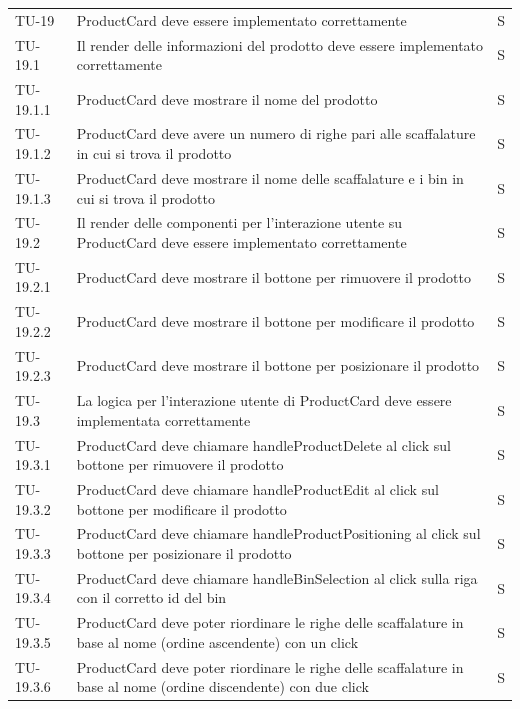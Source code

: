 \begin{xltabular}{0.9\textwidth}{X | p{0.6\textwidth} | p{0.1\textwidth} }
    TU-19 & ProductCard deve essere implementato correttamente & S\\
    TU-19.1 & Il render delle informazioni del prodotto deve essere implementato correttamente & S\\ 
    TU-19.1.1 & ProductCard deve mostrare il nome del prodotto & S\\ 
    TU-19.1.2 & ProductCard deve avere un numero di righe pari alle scaffalature in cui si trova il prodotto & S\\
    TU-19.1.3 & ProductCard deve mostrare il nome delle scaffalature e i bin in cui si trova il prodotto & S\\
    TU-19.2 & Il render delle componenti per l'interazione utente su ProductCard deve essere implementato correttamente & S\\
    TU-19.2.1 & ProductCard deve mostrare il bottone per rimuovere il prodotto & S\\
    TU-19.2.2 & ProductCard deve mostrare il bottone per modificare il prodotto & S\\
    TU-19.2.3 & ProductCard deve mostrare il bottone per posizionare il prodotto & S\\
    TU-19.3 & La logica per l'interazione utente di ProductCard deve essere implementata correttamente & S\\
    TU-19.3.1 & ProductCard deve chiamare handleProductDelete al click sul bottone per rimuovere il prodotto & S\\
    TU-19.3.2 & ProductCard deve chiamare handleProductEdit al click sul bottone per modificare il prodotto & S\\
    TU-19.3.3 & ProductCard deve chiamare handleProductPositioning al click sul bottone per posizionare il prodotto & S\\
    TU-19.3.4 & ProductCard deve chiamare handleBinSelection al click sulla riga con il corretto id del bin & S\\
    TU-19.3.5 & ProductCard deve poter riordinare le righe delle scaffalature in base al nome (ordine ascendente) con un click & S\\
    TU-19.3.6 & ProductCard deve poter riordinare le righe delle scaffalature in base al nome (ordine discendente) con due click & S\\


\end{xltabular}
